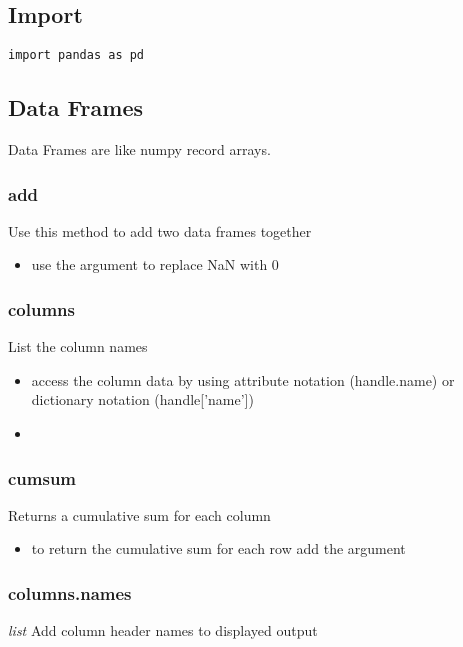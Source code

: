 \subsection{Import}
\begin{lstlisting}
import pandas as pd
\end{lstlisting}

\subsection{Data Frames}
Data Frames are like numpy record arrays.

%
\subsubsection{add}
Use this method to add two data frames together
  \begin{itemize}
    \item use the {\color{red}{fill\_value=0}} argument to replace NaN with 0
  \end{itemize}

%
\subsubsection{columns}
List the column names
  \begin{itemize}

    \item access the column data by using attribute notation (handle.name) or
      dictionary notation (handle['name'])

    \item \color{red}{If the column name is more than one word you must use
      the dictionary notation}
  \end{itemize}

%
\subsubsection{cumsum}
Returns a cumulative sum for each column
  \begin{itemize}

    \item to return the cumulative sum for each row add the argument
      \color{red}{axis=1}
  \end{itemize}

%
\subsubsection{columns.names}
\textit{list} Add column header names to displayed output

